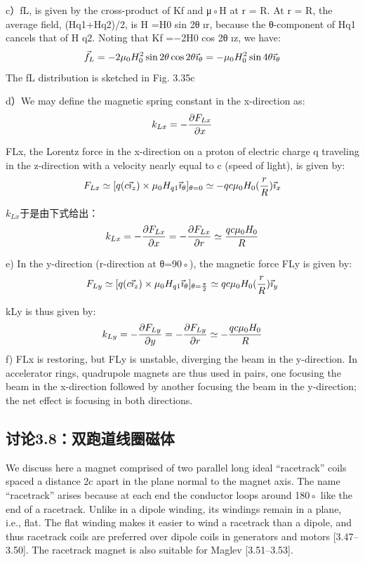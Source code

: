 c）fL, is given by the cross-product of Kf and μ◦H at r = R. At r = R, the
average field, (Hq1+Hq2)/2, is H =H0 sin 2θ	ır, because the θ-component of Hq1
cancels that of H
q2. Noting that Kf =−2H0 cos 2θ	ız, we have:
$$
\vec{f}_{L}=-2\mu_{0}H_{0}^{2}\sin2\theta \cos2\theta\vec{\imath}_{\theta}\\
=-\mu_{0}H_{0}^{2}\sin4\theta\vec{\imath}_{\theta}\\%
$$
The fL distribution is sketched in Fig. 3.35c

d）We may define the magnetic spring constant in the x-direction as:
$$
k_{Lx}=-\frac{\partial F_{Lx}}{\partial x}\\%
$$

FLx, the Lorentz force in the x-direction on a proton of electric charge q traveling
in the z-direction with a velocity nearly equal to c (speed of light), is given by:
$$
F_{Lx}\simeq[q(c\vec{\imath}_{z})\times\mu_{0}H_{q1}\vec{\imath}_{\theta}]_{\theta=0}\\
\simeq-qc\mu_{0}H_{0}(\frac{r}{R})\vec{\imath}_{x}\\%
$$

$k_{Lx}$于是由下式给出：
$$k_{Lx}=-\frac{\partial F_{Lx}}{\partial x}=-\frac{\partial F_{Lx}}{\partial r}\\
\simeq \frac{qc\mu_{0}H_{0}}{R}\\%
$$

e) In the y-direction (r-direction at θ=90◦), the magnetic force FLy is given by:
$$
F_{Ly}\simeq[q(c\vec{\imath}_{z})\times\mu_{0}H_{q1}\vec{\imath}_{\theta}]_{\theta=\frac{\pi}{2}}\\
\simeq qc\mu_{0}H_{0}(\frac{r}{R})\vec{\imath}_{y}\\%
$$

kLy is thus given by:
$$
k_{Ly}=-\frac{\partial F_{Ly}}{\partial y}=-\frac{\partial F_{Ly}}{\partial r}\\
\simeq-\frac{qc \mu_{0}H_{0}}{R}\\%
$$
f) FLx is restoring, but FLy is unstable, diverging the beam in the y-direction.
In accelerator rings, quadrupole magnets are thus used in pairs, one focusing the
beam in the x-direction followed by another focusing the beam in the y-direction;
the net effect is focusing in both directions.
\newpage



\subsection{讨论3.8：双跑道线圈磁体}
We discuss here a magnet comprised of two parallel long ideal “racetrack” coils
spaced a distance 2c apart in the plane normal to the magnet axis. The name
“racetrack” arises because at each end the conductor loops around 180◦ like the
end of a racetrack. Unlike in a dipole winding, its windings remain in a plane, i.e.,
flat. The flat winding makes it easier to wind a racetrack than a dipole, and thus
racetrack coils are preferred over dipole coils in generators and motors [3.47–3.50].
The racetrack magnet is also suitable for Maglev [3.51–3.53].

